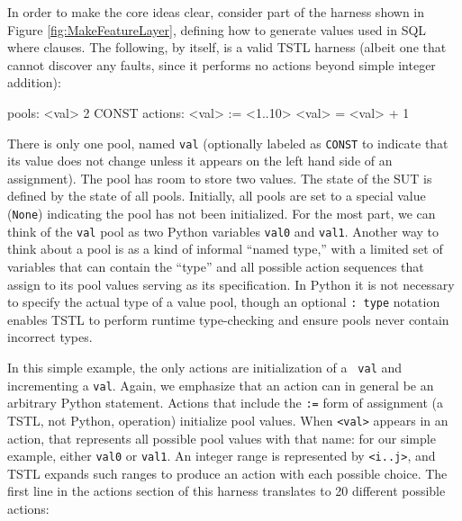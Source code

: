 In order to make the core ideas clear,
consider part of the harness shown in Figure \ref{fig:MakeFeatureLayer}, defining how to
generate values used in SQL where clauses.  The following, by itself,
is a valid TSTL harness (albeit one that cannot discover any
faults, since it performs no actions beyond simple integer addition):

{\scriptsize
\begin{code}
pools:
  <val> 2 CONST
\vspace{0.05in}
actions:
\vspace{0.05in}
<val> := <1..10>
<val> = <val> + 1
\end{code}
}

There is only one pool, named {\tt val} (optionally labeled as {\tt CONST} to
indicate that its value does not change unless it appears on the left
hand side of an assignment).  The pool has room to store
two values.  The state of the SUT is defined by the state of all
pools.  Initially, all pools are set to a special value ({\tt None}) indicating the
pool has not been initialized.  For the most part, we can think of the
{\tt val} pool as two Python variables {\tt val0} and {\tt val1}.  Another
way to think about a pool is as a kind of informal ``named type,''
with a limited set of variables that can contain the ``type'' and all
possible action sequences that assign to its pool values serving as
its specification.  In Python it is not necessary to specify the
actual type
of a value pool, though an optional {\tt : type} notation enables TSTL
to perform runtime type-checking and ensure pools never contain
incorrect types.

In this simple example, the only actions are initialization of a {\tt
  val} and incrementing a {\tt val}.  Again, we emphasize that an
action can in general be an arbitrary Python statement.  Actions that
include the {\tt :=} form of assignment (a TSTL, not Python,
operation) initialize pool values.  When {\tt <val>} appears in an
action, that represents all possible pool values with that name: for
our simple example, either {\tt val0} or {\tt val1}.  An integer range
is represented by {\tt <i..j>}, and TSTL expands such ranges to
produce an action with each possible choice. The first line in the
actions section of this harness translates to 20 different possible
actions:

